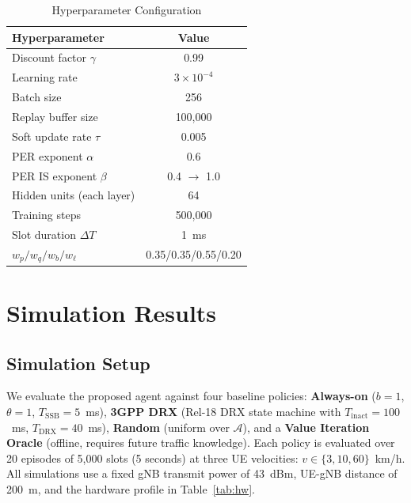 \documentclass[conference]{IEEEtran}
\begin{document}
\begin{table}[t]
  \centering
  \caption{Hyperparameter Configuration}
  \label{tab:hyperparams}
  \begin{tabular}{lc}
    \toprule
    Hyperparameter & Value \\
    \midrule
    Discount factor $\gamma$    & 0.99 \\
    Learning rate               & $3 \times 10^{-4}$ \\
    Batch size                  & 256 \\
    Replay buffer size          & 100,000 \\
    Soft update rate $\tau$     & 0.005 \\
    PER exponent $\alpha$       & 0.6 \\
    PER IS exponent $\beta$     & 0.4 $\to$ 1.0 \\
    Hidden units (each layer)   & 64 \\
    Training steps              & 500,000 \\
    Slot duration $\Delta T$    & 1~ms \\
    $w_p / w_q / w_b / w_\ell$ & 0.35/0.35/0.55/0.20 \\
    \bottomrule
  \end{tabular}
\end{table}

\section{Simulation Results}
\label{sec:results}

\subsection{Simulation Setup}

We evaluate the proposed agent against four baseline policies:
\textbf{Always-on} ($b=1$, $\theta=1$, $T_{\mathrm{SSB}}=5$~ms),
\textbf{3GPP DRX} (Rel-18 DRX state machine with $T_{\mathrm{inact}}=100$~ms,
$T_{\mathrm{DRX}}=40$~ms), \textbf{Random} (uniform over $\mathcal{A}$),
and a \textbf{Value Iteration Oracle} (offline, requires future traffic knowledge).
Each policy is evaluated over 20 episodes of 5,000 slots (5 seconds)
at three UE velocities: $v \in \{3, 10, 60\}$~km/h.
All simulations use a fixed gNB transmit power of 43~dBm,
UE-gNB distance of 200~m, and the hardware profile in Table~\ref{tab:hw}.
\end{document}
